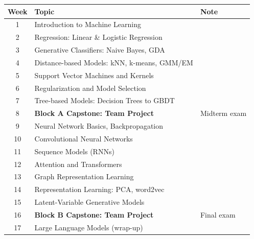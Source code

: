 \documentclass[11pt]{article}
\begin{document}
\begin{center}
\small
\begin{tabular}{@{}clp{5cm}@{}}
\toprule
Week & Topic & Note \\
\midrule
1 & Introduction to Machine Learning & \\
2 & Regression: Linear \& Logistic Regression & \\
3 & Generative Classifiers: Naive Bayes, GDA & \\
4 & Distance-based Models: kNN, k-means, GMM/EM & \\
5 & Support Vector Machines and Kernels & \\
6 & Regularization and Model Selection & \\
7 & Tree-based Models: Decision Trees to GBDT & \\
8 & \textbf{Block A Capstone: Team Project} & Midterm exam \\
9 & Neural Network Basics, Backpropagation & \\
10 & Convolutional Neural Networks & \\
11 & Sequence Models (RNNs) & \\
12 & Attention and Transformers & \\
13 & Graph Representation Learning & \\
14 & Representation Learning: PCA, word2vec & \\
15 & Latent-Variable Generative Models & \\
16 & \textbf{Block B Capstone: Team Project} & Final exam \\
17 & Large Language Models (wrap-up) & \\
\bottomrule
\end{tabular}
\end{center}

\vspace{4pt}
\end{document}
